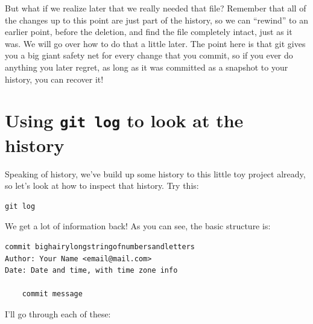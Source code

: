 \documentclass[11pt]{article}
\begin{document}
But what if we realize later that we really needed that file?  Remember that all of the changes up to this point are just part of the history, so we can ``rewind'' to an earlier point, before the deletion, and find the file completely intact, just as it was.  We will go over how to do that a little later.  The point here is that git gives you a big giant safety net for every change that you commit, so if you ever do anything you later regret, as long as it was committed as a snapshot to your history, you can recover it!
\section{Using \texttt{git log} to look at the history}
\label{sec-8}

Speaking of history, we've build up some history to this little toy project already, so let's look at how to inspect that history.  Try this:


\begin{verbatim}
git log
\end{verbatim}

We get a lot of information back!  As you can see, the basic structure is:


\begin{verbatim}
commit bighairylongstringofnumbersandletters
Author: Your Name <email@mail.com>
Date: Date and time, with time zone info

    commit message
\end{verbatim}

I'll go through each of these:
\end{document}
